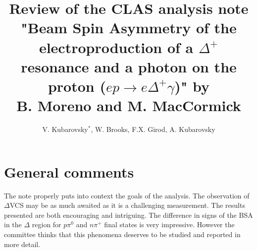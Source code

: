 \documentclass[11pt]{paper}
\title{Review of the CLAS analysis note\\ "Beam Spin Asymmetry of the electroproduction of a 
$\Delta^+$ resonance and a photon on the proton 
($ep\to e \Delta^+\gamma$)" by\\
B. Moreno and M. MacCormick 
  }
\author{V. Kubarovsky$^*$, W. Brooks, F.X. Girod, A. Kubarovsky}
\begin{document}
\maketitle

\let\oldthefootnote\thefootnote
\renewcommand{\thefootnote}{\fnsymbol{footnote}}

\let\thefootnote\oldthefootnote


\section*{General comments}


The note properly puts into context the goals of the analysis.
The observation of $\Delta$VCS may be as much awaited as it is a challenging measurement.
The results presented are both encouraging and intriguing. 
The difference in signs of the BSA in the $\Delta$ region for $p\pi^0$ and $n\pi^+$ final states
is very impressive. However the committee thinks that this phenomena deserves to be
studied and reported in more detail. 
\end{document}
